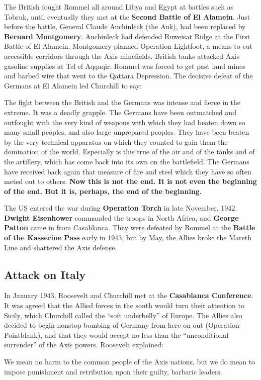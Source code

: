 The British fought Rommel all around Libya and Egypt at battles such as Tobruk,
until eventually they met at the \textbf{Second Battle of El Alamein}.
Just before the battle, General Claude Auchinleck (the Auk),
had been replaced by \textbf{Bernard Montgomery}.
Auchinleck had defended Ruweisat Ridge at the First Battle of El Alamein.
Montgomery planned Operation Lightfoot,
a means to cut accessible corridors through the Axis minefields.
British tanks attacked Axis gasoline supplies at Tel el Aqqaqir.
Rommel was forced to get past land mines and barbed wire that went to the Qattara Depression.
The decisive defeat of the Germans at El Alamein led Churchill to say:
\begin{quoting}
  The fight between the British and the Germans was intense and fierce in the extreme.
  It was a deadly grapple.
  The Germans have been outmatched and outfought with the very kind of weapons
  with which they had beaten down so many small peoples, and also large unprepared peoples.
  They have been beaten by the very technical apparatus
  on which they counted to gain them the domination of the world.
  Especially is this true of the air and of the tanks and of the artillery,
  which has come back into its own on the battlefield.
  The Germans have received back again that measure of fire and steel
  which they have so often meted out to others.
  \textbf{%
    Now this is not the end.
    It is not even the beginning of the end.
    But it is, perhaps, the end of the beginning.
  }
\end{quoting}

The US entered the war during \textbf{Operation Torch} in late November, 1942.
\textbf{Dwight Eisenhower} commanded the troops in North Africa,
and \textbf{George Patton} came in from Casablanca.
They were defeated by Rommel at the \textbf{Battle of the Kasserine Pass} early in 1943,
but by May, the Allies broke the Mareth Line and shattered the Axis defense.

\subsection*{Attack on Italy}

In January 1943, Roosevelt and Churchill met at the \textbf{Casablanca Conference}.
It was agreed that the Allied forces in the south would turn their attention to Sicily,
which Churchill called the ``soft underbelly'' of Europe.
The Allies also decided to begin nonstop bombing of Germany from here on out (Operation Pointblank),
and that they would accept no less than the ``unconditional surrender'' of the Axis powers.
Roosevelt explained:
\begin{quoting}
  We mean no harm to the common people of the Axis nations,
  but we do mean to impose punishment and retribution upon their guilty, barbaric leaders.
\end{quoting}

